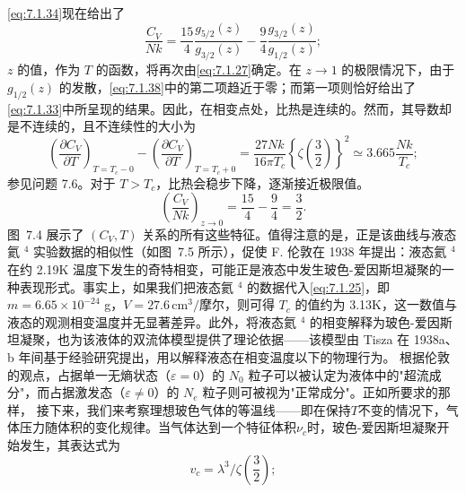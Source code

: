 \autoref{eq:7.1.34}现在给出了
\begin{equation}\tag{7.1.38}\label{eq:7.1.38}
\frac { C _ { V } } { N k } = \frac { 15 } { 4 } \frac { g _ { 5 / 2 } ( z ) } { g _ { 3 / 2 } ( z ) } - \frac { 9 } { 4 } \frac { g _ { 3 / 2 } ( z ) } { g _ { 1 / 2 } ( z ) } ;
\end{equation}
\(z\) 的值，作为 \(T\) 的函数，将再次由\autoref{eq:7.1.27}确定。在 \(z \to 1\) 的极限情况下，由于 \(g_{1/2}(z)\) 的发散，\autoref{eq:7.1.38}中的第二项趋近于零；而第一项则恰好给出了\autoref{eq:7.1.33}中所呈现的结果。因此，在相变点处，比热是连续的。然而，其导数却是不连续的，且不连续性的大小为
\begin{equation}\tag{7.1.39}\label{eq:7.1.39}
\left( \frac { \partial C _ { V } } { \partial T } \right) _ { T = T _ { c } - 0 } - \left( \frac { \partial C _ { V } } { \partial T } \right) _ { T = T _ { c } + 0 } = \frac { 27 N k } { 16 \pi T _ { c } } \left\{ \zeta \left( \frac { 3 } { 2 } \right) \right\} ^{2} \simeq 3 . 66 5 \frac { N k } { T _ { c } } ;
\end{equation}
参见问题 7.6。对于 \(T > T_c\)，比热会稳步下降，逐渐接近极限值。
\begin{equation}\tag{7.1.40}\label{eq:7.1.40}
\left( \frac { C _ { V } } { N k } \right) _ { z \rightarrow 0 } = \frac { 15 } { 4 } - \frac { 9 } { 4 } = \frac { 3 } { 2 } .
\end{equation}
图~7.4 展示了 \((C_V, T)\) 关系的所有这些特征。值得注意的是，正是该曲线与液态氦 \(^4\) 实验数据的相似性（如图~7.5 所示），促使 F. 伦敦在 1938 年提出：液态氦 \(^4\) 在约 2.19K 温度下发生的奇特相变，可能正是液态中发生玻色-爱因斯坦凝聚的一种表现形式。事实上，如果我们把液态氦 \(^4\) 的数据代入\autoref{eq:7.1.25}，即 \(m=6.65 \times 10^{-24}\) g，\(V=27.6 \, \text{cm}^3/\text{摩尔}\)，则可得 \(T_c\) 的值约为 3.13K，这一数值与液态的观测相变温度并无显著差异。此外，将液态氦 \(^4\) 的相变解释为玻色-爱因斯坦凝聚，也为该液体的双流体模型提供了理论依据——该模型由 Tisza 在 1938a、b 年间基于经验研究提出，用以解释液态在相变温度以下的物理行为。
根据伦敦的观点，占据单一无熵状态（\(\varepsilon=0\)）的 \(N_{0}\) 粒子可以被认定为液体中的"超流成分"，而占据激发态（\(\varepsilon\neq0\)）的 \(N_{e}\) 粒子则可被视为"正常成分"。正如所要求的那样，
接下来，我们来考察理想玻色气体的等温线——即在保持\(T\)不变的情况下，气体压力随体积的变化规律。当气体达到一个特征体积\(\nu_{c}\)时，玻色-爱因斯坦凝聚开始发生，其表达式为
\begin{equation}\tag{7.1.41}\label{eq:7.1.41}
v _ { c } = \lambda ^{3} / \zeta \left( \frac { 3 } { 2 } \right) ;
\end{equation}

